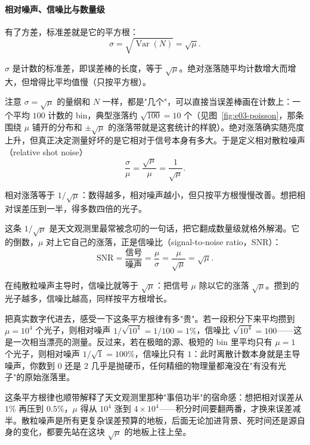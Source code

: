 \paragraph{相对噪声、信噪比与数量级}

有了方差，标准差就是它的平方根：
\begin{equation}
  \sigma=\sqrt{\operatorname{Var}(N)}=\sqrt{\mu}.
  \label{eq:e03-sigma}
\end{equation}
\begin{formulaexplain}
$\sigma$ 是计数的标准差，即误差棒的长度，等于 $\sqrt{\mu}$。绝对涨落随平均计数增大而增大，但增得比平均值慢（只按平方根）。
\end{formulaexplain}
注意 $\sigma=\sqrt{\mu}$ 的量纲和 $N$ 一样，都是"几个"，可以直接当误差棒画在计数上：一个平均 $100$ 计数的 bin，典型涨落约 $\sqrt{100}=10$ 个（见图~\ref{fig:e03-poisson}，那条围绕 $\mu$ 铺开的分布和 $\pm\sqrt{\mu}$ 的涨落带就是这套统计的样貌）。绝对涨落确实随亮度上升，但真正决定测量好坏的是它相对于信号本身有多大。于是定义相对散粒噪声（relative shot noise）
\begin{equation}
  \frac{\sigma}{\mu}=\frac{\sqrt{\mu}}{\mu}=\frac{1}{\sqrt{\mu}} .
  \label{eq:e03-relative}
\end{equation}
\begin{formulaexplain}
相对涨落等于 $1/\sqrt{\mu}$：数得越多，相对噪声越小，但只按平方根慢慢改善。想把相对误差压到一半，得多数四倍的光子。
\end{formulaexplain}
这条 $1/\sqrt{\mu}$ 是天文观测里最常被念叨的一句话，把它翻成数量级就格外解渴。它的倒数，$\mu$ 对上它自己的涨落，正是信噪比（signal-to-noise ratio，SNR）：
\begin{equation}
  \mathrm{SNR}=\frac{\text{信号}}{\text{噪声}}=\frac{\mu}{\sigma}=\frac{\mu}{\sqrt{\mu}}=\sqrt{\mu}.
  \label{eq:e03-snr}
\end{equation}
\begin{formulaexplain}
在纯散粒噪声主导时，信噪比就等于 $\sqrt{\mu}$：把信号 $\mu$ 除以它的涨落 $\sqrt{\mu}$。攒到的光子越多，信噪比越高，同样按平方根增长。
\end{formulaexplain}
把真实数字代进去，感受一下这条平方根律有多"贵"。若一段积分下来平均攒到 $\mu=10^{4}$ 个光子，则相对噪声 $1/\sqrt{10^4}=1/100=1\%$，信噪比 $\sqrt{10^4}=100$——这是一次相当漂亮的测量。反过来，若在极暗的源、极短的 bin 里平均只有 $\mu=1$ 个光子，则相对噪声 $1/\sqrt{1}=100\%$，信噪比只有 $1$：此时离散计数本身就是主导噪声，你数到 $0$ 还是 $2$ 几乎是抛硬币，任何精细的物理量都淹没在"有没有光子"的原始涨落里。

这条平方根律也顺带解释了天文观测里那种"事倍功半"的宿命感：想把相对误差从 $1\%$ 再压到 $0.5\%$，$\mu$ 得从 $10^4$ 涨到 $4\times10^4$——积分时间要翻两番，才换来误差减半。散粒噪声是所有更复杂误差预算的地板，后面无论加进背景、死时间还是源自身的变化，都要先站在这块 $\sqrt{\mu}$ 的地板上往上垒。

